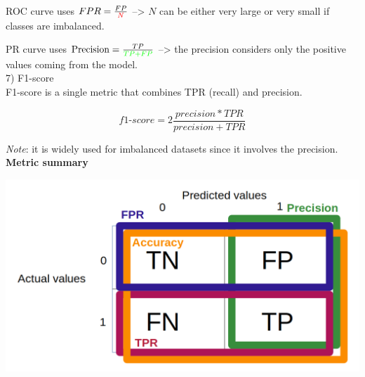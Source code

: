 ROC curve uses $FPR = \frac{FP}{\textcolor{red}{N}} $ --> $N$ can be either very large or very small if classes are imbalanced.

PR curve uses $\text{Precision} = \frac{TP}{\textcolor{green}{TP + FP}}$ --> the precision considers only the positive values coming from the model. \\

7) F1-score \\

F1-score is a single metric that combines TPR (recall) and precision.

$$f1 \text{-} score = 2\frac{precision*TPR}{precision+TPR}$$

\textit{Note}: it is widely used for imbalanced datasets since it involves the precision. \\

\textbf{Metric summary} \\

\begin{center}
\includegraphics[scale=0.3]{confusion_matrix.png}
\end{center}

\vspace{5mm}
